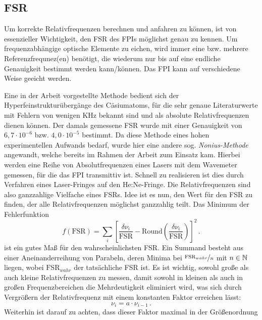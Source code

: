 \subsection{FSR}\label{subsec:FSR-messung}
Um korrekte Relativfrequenzen berechnen und anfahren zu
können, ist von essenzieller Wichtigkeit, den FSR des FPIs möglichst genau zu kennen. Um
frequenzabhängige optische Elemente zu eichen, wird immer eine bzw. mehrere
Referenzfrequnez(en) benötigt, die wiederum nur bis auf eine endliche
Genauigkeit bestimmt werden kann/können. Das FPI kann auf verschiedene
Weise geeicht werden.\par
Eine in der Arbeit \cite{kuschnick:2000:diplomarbeit}
vorgestellte Methode bedient sich der Hyperfeinstrukturübergänge des
Cäsiumatoms, für die sehr genaue Literaturwerte mit Fehlern von wenigen KHz \cite{PhysRevA.38.1616} bekannt sind
und als absolute Relativfrequenzen dienen können. Der damals gemessene FSR wurde
mit einer Genauigkeit von $6,7\cdot10^{-6}$ bzw. $4,0\cdot10^{-5}$ bestimmt. Da
diese Methode eines hohen experimentellen Aufwands bedarf, wurde hier
eine andere sog. \textit{Nonius-Methode} angewandt, welche bereits im Rahmen der
Arbeit \cite{schumann:2005:dissertation} zum Einsatz kam. Hierbei werden eine
Reihe von Absolutfrequenzen eines Lasers mit dem Wavemeter gemessen, für die das
FPI transmittiv ist. Schnell zu realisieren ist dies durch Verfahren eines
Laser-Fringes auf den He:Ne-Fringe. Die Relativfrequenzen sind also ganzzahlige
Vielfache eines FSRs. Idee ist es nun, den Wert für den FSR zu finden, der alle
Relativfrequenzen möglichst ganzzahlig teilt. Das Minimum der Fehlerfunktion
\begin{equation}\label{eq:nonius}
	f(\text{FSR})=\sum\limits_i\left[\frac{\delta\nu_i}{\text{FSR}}-\text{Round}\left(\frac{\delta\nu_i}{\text{FSR}}\right)\right]^2\,.
\end{equation}
ist ein gutes Maß für den wahrscheinlichsten FSR.
Ein Summand besteht aus einer Aneinanderreihung von Parabeln, deren Minima bei
$\nicefrac{\text{FSR}_{wahr}}{n}$ mit $n\in\mathbb{N}$ liegen, wobei $\text{FSR}_{wahr}$
der tatsächliche FSR ist. Es ist wichtig, sowohl große als auch kleine
Relativfrequenzen zu messen, damit sowohl in kleinen als auch in großen
Frequenzbereichen die Mehrdeutigkeit eliminiert wird, was sich durch Vergrößern
der Relativfrequenz mit einem konstanten Faktor erreichen lässt:
\begin{equation}\label{eq:nonius_faktor}
	\nu_i=a\cdot\nu_{i-1}\,.
\end{equation}
Weiterhin ist darauf zu achten, dass dieser Faktor maximal in der Größenordnung
